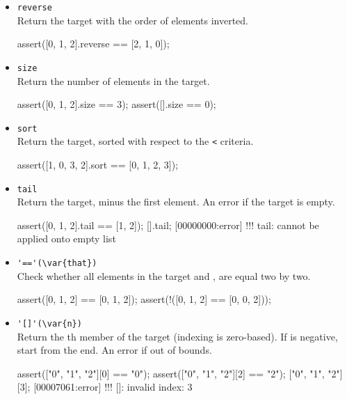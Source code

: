 \begin{itemize}
\item \lstinline|reverse|\\
Return the target with the order of elements inverted.

\begin{urbiscript}[firstnumber=last]
assert([0, 1, 2].reverse == [2, 1, 0]);
\end{urbiscript}

\item \lstinline|size|\\
Return the number of elements in the target.

\begin{urbiscript}[firstnumber=last]
assert([0, 1, 2].size == 3);
assert([].size == 0);
\end{urbiscript}

\item \lstinline|sort|\\
Return the target, sorted with respect to the \lstinline|<| criteria.

\begin{urbiscript}[firstnumber=last]
assert([1, 0, 3, 2].sort == [0, 1, 2, 3]);
\end{urbiscript}

\item \lstinline|tail|\\
Return the target, minus the first element. An error if the target is
empty.

\begin{urbiscript}[firstnumber=last]
assert([0, 1, 2].tail == [1, 2]);
[].tail;
[00000000:error] !!! tail: cannot be applied onto empty list
\end{urbiscript}

\item \lstinline|'=='(\var{that})|\\
Check whether all elements in the target and , are
equal two by two.

\begin{urbiscript}[firstnumber=last]
assert([0, 1, 2] == [0, 1, 2]);
assert(!([0, 1, 2] == [0, 0, 2]));
\end{urbiscript}

\item \lstinline|'[]'(\var{n})|\\
  Return the th member of the target (indexing is
  zero-based). If  is negative, start from the end.  An error
  if out of bounds.

\begin{urbiscript}[firstnumber=last]
assert(["0", "1", "2"][0] == "0");
assert(["0", "1", "2"][2] == "2");
["0", "1", "2"][3];
[00007061:error] !!! []: invalid index: 3


\end{urbiscript}
\end{itemize}
